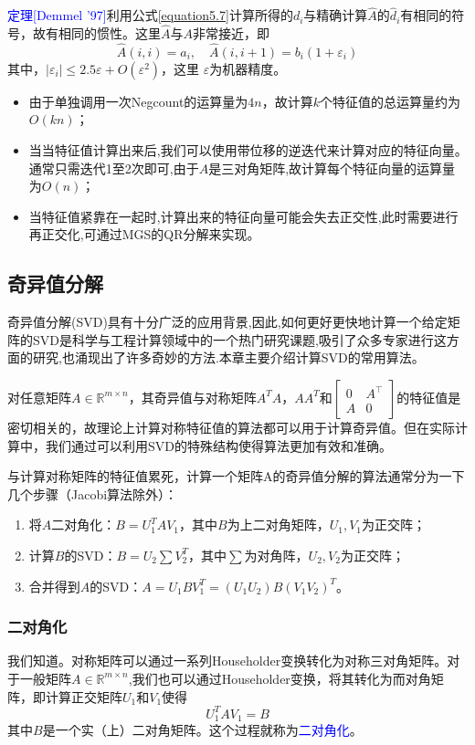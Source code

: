 \documentclass[12pt,a4paper]{article}
\begin{document}
\textcolor{blue}{定理[Demmel ’97]}利用公式\ref{equation5.7}计算所得的$d_i$与精确计算$\hat{A}$的$\hat{d}_i$有相同的符号，故有相同的惯性。这里$\hat{A}$与$A$非常接近，即$$
\hat{A}(i, i)=a_{i}, \quad \hat{A}(i, i+1)=b_{i}\left(1+\varepsilon_{i}\right)
$$
其中，$\left|\varepsilon_{i}\right| \leq 2.5 \varepsilon+O\left(\varepsilon^{2}\right)$，这里
$\varepsilon$为机器精度。
\begin{itemize}
	\item 由于单独调用一次Negcount的运算量为$4n$，故计算$k$个特征值的总运算量约为$O(k n)$；
	\item 当当特征值计算出来后,我们可以使用带位移的逆迭代来计算对应的特征向量。通常只需迭代1至2次即可,由于$A$是三对角矩阵,故计算每个特征向量的运算量为$O(n)$；
	\item 当特征值紧靠在一起时,计算出来的特征向量可能会失去正交性,此时需要进行再正交化,可通过MGS的QR分解来实现。
\end{itemize}
\subsection{奇异值分解}
奇异值分解(SVD)具有十分广泛的应用背景,因此,如何更好更快地计算一个给定矩阵的SVD是科学与工程计算领域中的一个热门研究课题,吸引了众多专家进行这方面的研究,也涌现出了许多奇妙的方法.本章主要介绍计算SVD的常用算法。

对任意矩阵$A \in \mathbb{R}^{m \times n}$，其奇异值与对称矩阵$A^TA$，$AA^T$和$\left[\begin{array}{ll}{0} & {A^{\top}} \\ {A} & {0}\end{array}\right]$的特征值是密切相关的，故理论上计算对称特征值的算法都可以用于计算奇异值。但在实际计算中，我们通过可以利用SVD的特殊结构使得算法更加有效和准确。

与计算对称矩阵的特征值累死，计算一个矩阵A的奇异值分解的算法通常分为一下几个步骤（Jacobi算法除外）：
\begin{enumerate}[1.]
	\item 将$A$二对角化：$B=U_1^TAV_1$，其中$B$为上二对角矩阵，$U_1,V_1$为正交阵；
	\item 计算$B$的SVD：$B=U_2\sum V_2^T$，其中$\sum$为对角阵，$U_2,V_2$为正交阵；
	\item 合并得到$A$的SVD：$A=U_1BV_1^T=(U_1U_2)B(V_1V_2)^T$。
\end{enumerate}
\subsubsection{二对角化}
我们知道。对称矩阵可以通过一系列Householder变换转化为对称三对角矩阵。对于一般矩阵$A \in \mathbb{R}^{m \times n}$,我们也可以通过Householder变换，将其转化为而对角矩阵，即计算正交矩阵$U_1$和$V_1$使得
\begin{equation}
U_1^TAV_1=B
\label{equation5.8}
\end{equation}
其中$B$是一个实（上）二对角矩阵。这个过程就称为\textcolor{blue}{二对角化}。
\end{document}
